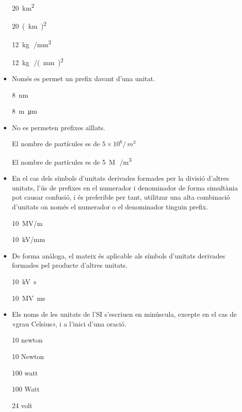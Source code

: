 \begin{itemize}
\textcolor{Green}\faCheckSquare{} \SI{20}{km^2}

\textcolor{Red}\faTimesCircle{} \SI{20}{(km)^2}

\textcolor{Green}\faCheckSquare{}  \SI{12}{kg\,/mm^2}

\textcolor{Red}\faTimesCircle{}  \SI{12}{kg\,/(mm)^2}


\item Només es permet un prefix davant d'una unitat.

\textcolor{Green}\faCheckSquare{} \SI{8}{nm}

\textcolor{Red}\faTimesCircle{} \SI{8}{m\micro m}


\item No es permeten prefixes aïllats.

\textcolor{Green}\faCheckSquare{} El nombre de partícules es de $5\times 10^6 /\si{\,m^3}$

\textcolor{Red}\faTimesCircle{} El nombre de partícules es de \SI{5}{M\,/m^3}


\item En el cas dels símbols d'unitats derivades formades per la divisió
d'altres unitats, l'ús de prefixes en el numerador i denominador de
forma simultània pot causar confusió, i és preferible per tant,
utilitzar una alta combinació d'unitats on només el numerador o el
denominador tinguin prefix.

\textcolor{Green}\faCheckSquare{} \SI{10}{MV/m}

\textcolor{Blue}\faExclamationTriangle{}  \SI{10}{kV/mm}


\item De forma anàloga, el mateix és aplicable als símbols d'unitats
derivades formades pel producte d'altres unitats.

\textcolor{Green}\faCheckSquare{} \SI{10}{kV.s}

\textcolor{Blue}\faExclamationTriangle{}  \SI{10}{MV.ms}


\item Els noms de les unitats de l'SI s'escriuen en minúscula, excepte en
el cas de «grau Celsius», i a l'inici d'una oració.

\textcolor{Green}\faCheckSquare{} 10 newton

\textcolor{Red}\faTimesCircle{} 10 Newton

\textcolor{Green}\faCheckSquare{}  100 watt

\textcolor{Red}\faTimesCircle{} 100 Watt

\textcolor{Green}\faCheckSquare{}  24 volt


\end{itemize}
